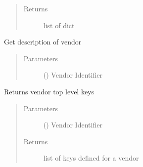 \documentclass[letterpaper,10pt,english]{sphinxmanual}
\begin{document}
\begin{fulllineitems}
\begin{fulllineitems}
\begin{quote}
\begin{description}
\item[{Returns}] \leavevmode
\sphinxAtStartPar
list of dict

\end{description}\end{quote}

\end{fulllineitems}


\begin{fulllineitems}
\label{\detokenize{dhcp-option-data-class:bloxone.DHCP_OPTION_DEFS.vendor_description}}
\sphinxAtStartPar
Get description of vendor
\begin{quote}\begin{description}
\item[{Parameters}] \leavevmode
\sphinxAtStartPar
{} () \textendash{} Vendor Identifier

\end{description}\end{quote}

\end{fulllineitems}


\begin{fulllineitems}
\label{\detokenize{dhcp-option-data-class:bloxone.DHCP_OPTION_DEFS.vendor_keys}}
\sphinxAtStartPar
Returns vendor top level keys
\begin{quote}\begin{description}
\item[{Parameters}] \leavevmode
\sphinxAtStartPar
{} () \textendash{} Vendor Identifier

\item[{Returns}] \leavevmode
\sphinxAtStartPar
list of keys defined for a vendor

\end{description}\end{quote}


\end{fulllineitems}
\end{fulllineitems}
\end{document}
